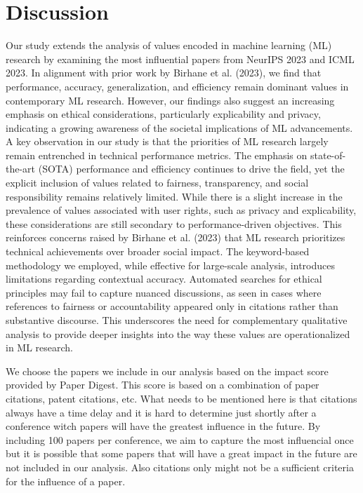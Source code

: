 \documentclass{article}
\begin{document}
\section{Discussion}
Our study extends the analysis of values encoded in machine learning (ML) research by examining the most influential papers from NeurIPS 2023 and ICML 2023. In alignment with prior work by Birhane et al. (2023), 
we find that performance, accuracy, generalization, and efficiency remain dominant values in contemporary ML research. However, our findings also suggest an increasing emphasis on ethical considerations, particularly 
explicability and privacy, indicating a growing awareness of the societal implications of ML advancements.
A key observation in our study is that the priorities of ML research largely remain entrenched in technical performance metrics. The emphasis on state-of-the-art (SOTA) performance and efficiency continues to drive the field, 
yet the explicit inclusion of values related to fairness, transparency, and social responsibility remains relatively limited. While there is a slight increase in the prevalence of values associated with user rights, such as 
privacy and explicability, these considerations are still secondary to performance-driven objectives. This reinforces concerns raised by Birhane et al. (2023) that ML research prioritizes technical achievements over broader 
social impact.
The keyword-based methodology we employed, while effective for large-scale analysis, introduces limitations regarding contextual accuracy. Automated searches for ethical principles may fail to capture nuanced discussions, 
as seen in cases where references to fairness or accountability appeared only in citations rather than substantive discourse. This underscores the need for complementary qualitative analysis to provide deeper insights into 
the way these values are operationalized in ML research.

We choose the papers we include in our analysis based on the impact score provided by Paper Digest. This score is based on a combination of paper citations, patent citations, etc. What needs to be mentioned here is that
citations always have a time delay and it is hard to determine just shortly after a conference witch papers will have the greatest influence in the future. By including 100 papers per conference, we aim to 
capture the most influencial once but it is possible that some papers that will have a great impact in the future are not included in our analysis. Also citations only might not be a sufficient criteria for the influence of a paper. 
\end{document}
